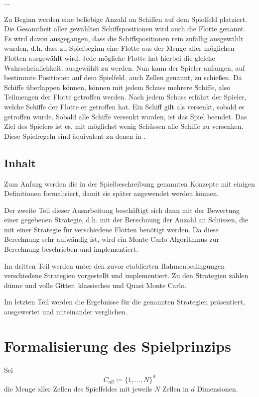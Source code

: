 \documentclass[a4paper,12pt]{llncs}
\numberwithin{equation}{section}
\begin{document}
...

Zu Beginn werden eine beliebige Anzahl an Schiffen auf dem Spielfeld platziert.
Die Gesamtheit aller gewählten Schiffspositionen wird auch die Flotte genannt.
Es wird davon ausgegangen, dass die Schiffspositionen rein zufällig ausgewählt wurden, d.h. dass zu Spielbeginn eine Flotte aus der Menge aller möglichen Flotten ausgewählt wird. Jede mögliche Flotte hat hierbei die gleiche Wahrscheinlichkeit, ausgewählt zu werden.
Nun kann der Spieler anfangen, auf bestimmte Positionen auf dem Spielfeld, auch Zellen genannt, zu schießen.
Da Schiffe überlappen können, können mit jedem Schuss mehrere Schiffe, also Teilmengen der Flotte getroffen werden.
Nach jedem Schuss erfährt der Spieler, welche Schiffe der Flotte er getroffen hat.
Ein Schiff gilt als versenkt, sobald es getroffen wurde.
Sobald alle Schiffe versenkt wurden, ist das Spiel beendet.
Das Ziel des Spielers ist es, mit möglichst wenig Schüssen alle Schiffe zu versenken.
Diese Spielregeln sind äquivalent zu denen in \cite{}.


\subsection{Inhalt}

Zum Anfang werden die in der Spielbeschreibung genannten Konzepte mit einigen Definitionen formalisiert, damit sie später angewendet werden können.

Der zweite Teil dieser Ausarbeitung beschäftigt sich dann mit der Bewertung einer gegebenen Strategie, d.h. mit der Berechnung der Anzahl an Schüssen, die mit einer Strategie für verschiedene Flotten benötigt werden.
Da diese Berechnung sehr aufwändig ist, wird ein Monte-Carlo Algorithmus zur Berechnung beschrieben und implementiert.

Im dritten Teil werden unter den zuvor etablierten Rahmenbedingungen verschiedene Strategien vorgestellt und implementiert. Zu den Strategien zählen dünne und volle Gitter, klassisches und Quasi Monte Carlo.

Im letzten Teil werden die Ergebnisse für die genannten Strategien präsentiert, ausgewertet und miteinander verglichen.

\section{Formalisierung des Spielprinzips}

\begin{definition}
Sei
\[
C_{all} \coloneqq \{1, \dots, N\}^d
\]
die Menge aller Zellen des Spielfeldes mit jeweils $N$ Zellen in $d$ Dimensionen.
\end{definition}
\end{document}
